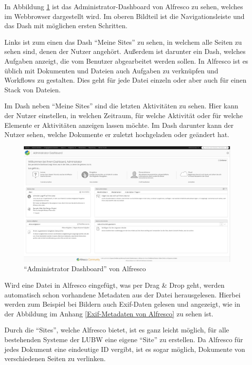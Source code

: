 In Abbildung \ref{Alfresco Dashboard} ist das Administrator-Dashboard von Alfresco zu sehen, welches im Webbrowser dargestellt wird.
Im oberen Bildteil ist die Navigationsleiste und das Dash mit m\"oglichen ersten Schritten.

Links ist zum einen das Dash "`Meine Sites"' zu sehen, in welchem alle Seiten zu sehen sind, denen der Nutzer angeh\"ort. Au\ss{}erdem ist darunter ein Dash, welches Aufgaben anzeigt, die vom Benutzer abgearbeitet werden sollen. In Alfresco ist es \"ublich mit Dokumenten und Dateien auch Aufgaben zu verkn\"upfen und Workflows zu gestalten. Dies geht f\"ur jede Datei einzeln oder aber auch f\"ur einen Stack von Dateien.

Im Dash neben "`Meine Sites"' sind die letzten Aktivit\"aten zu sehen. Hier kann der Nutzer einstellen, in welchen Zeitraum, f\"ur welche Aktivit\"at oder f\"ur welche Elemente er Aktivit\"aten anzeigen lassen m\"ochte.
Im Dash darunter kann der Nutzer sehen, welche Dokumente er zuletzt hochgeladen oder ge\"andert hat.

\begin{figure}[!ht]
\centering
\includegraphics[width=16cm]{Bilder/Alfresco_Oberflaeche.jpg}
\caption{"`Administrator Dashboard"' von Alfresco}
\label{Alfresco Dashboard}
\centering
\end{figure}

Wird eine Datei in Alfresco eingef\"ugt, was per Drag \& Drop geht, werden automatisch schon vorhandene Metadaten aus der Datei herausgelesen. Hierbei werden zum Beispiel bei Bildern auch \ac{Exif}-Daten gelesen und angezeigt, wie in der Abbildung im Anhang \ref{Exif-Metadaten von Alfresco} zu sehen ist. 

Durch die "`Sites"', welche Alfresco bietet, ist es ganz leicht m\"oglich, f\"ur alle bestehenden Systeme der \ac{LUBW} eine eigene "`Site"' zu erstellen. Da Alfresco f\"ur jedes Dokument eine eindeutige ID vergibt, ist es sogar m\"oglich, Dokumente von verschiedenen Seiten zu verlinken.
\cite{Eval_DMS_Bachelor}

